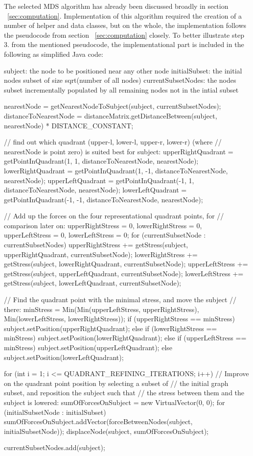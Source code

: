 The selected MDS algorithm has already been discussed broadly in section ~\ref{sec:computation}. Implementation of this algorithm required the creation of a number of helper and data classes, but on the whole, the implementation follows the pseudocode from section ~\ref{sec:computation} closely. To better illustrate step 3. from the mentioned pseudocode, the implementational part is included in the following as simplified Java code:

\begin{code}
subject: the node to be positioned near any other node
initialSubset: the initial nodes subset of size sqrt(number of all nodes)
currentSubsetNodes: the nodes subset incrementally populated 
  by all remaining nodes not in the intial subset

nearestNode = getNearestNodeToSubject(subject, currentSubsetNodes);
distanceToNearestNode = distanceMatrix.getDistanceBetween(subject, nearestNode)
    * DISTANCE_CONSTANT;

// find out which quadrant (upper-l, lower-l, upper-r, lower-r) (where
// nearestNode is point zero) is suited best for subject:
upperRightQuadrant = getPointInQuadrant(1, 1, distanceToNearestNode, nearestNode);
lowerRightQuadrant = getPointInQuadrant(1, -1, distanceToNearestNode, nearestNode);
upperLeftQuadrant = getPointInQuadrant(-1, 1, distanceToNearestNode, nearestNode);
lowerLeftQuadrant = getPointInQuadrant(-1, -1, distanceToNearestNode, nearestNode);

// Add up the forces on the four representational quadrant points, for
// comparison later on:
upperRightStress = 0, lowerRightStress = 0, upperLeftStress = 0, lowerLeftStress = 0;
for (currentSubsetNode : currentSubsetNodes) {
    upperRightStress += getStress(subject, upperRightQuadrant, currentSubsetNode);
    lowerRightStress += getStress(subject, lowerRightQuadrant, currentSubsetNode);
    upperLeftStress += getStress(subject, upperLeftQuadrant, currentSubsetNode);
    lowerLeftStress += getStress(subject, lowerLeftQuadrant, currentSubsetNode);
}

// Find the quadrant point with the minimal stress, and move the subject
// there:
minStress = Min(Min(upperLeftStress, upperRightStress),
    Min(lowerLeftStress, lowerRightStress));
if (upperRightStress == minStress)
    subject.setPosition(upperRightQuadrant);
else if (lowerRightStress == minStress)
    subject.setPosition(lowerRightQuadrant);
else if (upperLeftStress == minStress)
    subject.setPosition(upperLeftQuadrant);
else
    subject.setPosition(lowerLeftQuadrant);

for (int i = 1; i <= QUADRANT_REFINING_ITERATIONS; i++) {
    // Improve on the quadrant point position by selecting a subset of
    // the initial graph subset, and reposition the subject such that
    // the stress between them and the subject is lowered:
    sumOfForcesOnSubject = new VirtualVector(0, 0);
    for (initialSubsetNode : initialSubset)
        sumOfForcesOnSubject.addVector(forceBetweenNodes(subject, initialSubsetNode));
    displaceNode(subject, sumOfForcesOnSubject);
}

currentSubsetNodes.add(subject);
	
\end{code}

